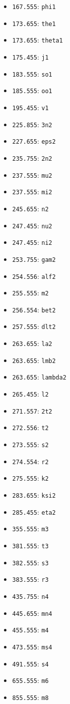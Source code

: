 \begin{itemize}
\item \verb|167.555|: \verb|phi1| \item \verb|173.655|: \verb|the1|    \item \verb|173.655|: \verb|theta1|
\item \verb|175.455|: \verb|j1|   \item \verb|183.555|: \verb|so1|     \item \verb|185.555|: \verb|oo1|
\item \verb|195.455|: \verb|v1|   \item \verb|225.855|: \verb|3n2|     \item \verb|227.655|: \verb|eps2|
\item \verb|235.755|: \verb|2n2|  \item \verb|237.555|: \verb|mu2|     \item \verb|237.555|: \verb|mi2|
\item \verb|245.655|: \verb|n2|   \item \verb|247.455|: \verb|nu2|     \item \verb|247.455|: \verb|ni2|
\item \verb|253.755|: \verb|gam2| \item \verb|254.556|: \verb|alf2|    \item \verb|255.555|: \verb|m2|
\item \verb|256.554|: \verb|bet2| \item \verb|257.555|: \verb|dlt2|    \item \verb|263.655|: \verb|la2|
\item \verb|263.655|: \verb|lmb2| \item \verb|263.655|: \verb|lambda2| \item \verb|265.455|: \verb|l2|
\item \verb|271.557|: \verb|2t2|  \item \verb|272.556|: \verb|t2|      \item \verb|273.555|: \verb|s2|
\item \verb|274.554|: \verb|r2|   \item \verb|275.555|: \verb|k2|      \item \verb|283.655|: \verb|ksi2|
\item \verb|285.455|: \verb|eta2| \item \verb|355.555|: \verb|m3|      \item \verb|381.555|: \verb|t3|
\item \verb|382.555|: \verb|s3|   \item \verb|383.555|: \verb|r3|      \item \verb|435.755|: \verb|n4|
\item \verb|445.655|: \verb|mn4|  \item \verb|455.555|: \verb|m4|      \item \verb|473.555|: \verb|ms4|
\item \verb|491.555|: \verb|s4|   \item \verb|655.555|: \verb|m6|      \item \verb|855.555|: \verb|m8|
\end{itemize}

